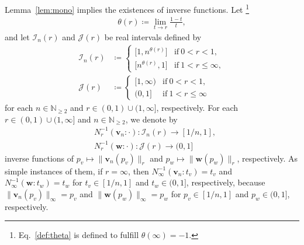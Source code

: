 \documentclass[conference, draftcls, onecolumn]{IEEEtran}
\theoremstyle{plain}
\newcommand{\bvec}[1]{\boldsymbol{#1}}
\newcommand{\lemref}[1]{Lemma~\ref{#1}}
\begin{document}
\lemref{lem:mono} implies the existences of inverse functions.
Let%
\footnote{Eq.~\eqref{def:theta} is defined to fulfill $\theta( \infty ) = -1$.}
\begin{align}
\theta( r )
\coloneqq
\lim_{t \to r} \frac{ 1 - t }{ t } ,
\label{def:theta}
\end{align}
and let $\mathcal{I}_{n}( r )$ and $\mathcal{J}( r )$ be real intervals defined by
\begin{align}
\mathcal{I}_{n}( r )
& \coloneqq
\begin{cases}
\big[ 1, n^{\theta( r )} \big]
& \mathrm{if} \ 0 < r < 1 ,
\\
\big[ n^{\theta( r )}, 1 \big]
& \mathrm{if} \ 1 < r \le \infty ,
\end{cases}
\label{def:I} \\
\mathcal{J}( r )
& \coloneqq
\begin{cases}
[1, \infty)
& \mathrm{if} \ 0 < r < 1 ,
\\
(0, 1]
& \mathrm{if} \ 1 < r \le \infty
\end{cases}
\label{def:J}
\end{align}
for each $n \in \mathbb{N}_{\ge 2}$ and $r \in (0, 1) \cup (1, \infty]$, respectively.
For each $r \in (0, 1) \cup (1, \infty]$ and $n \in \mathbb{N}_{\ge 2}$, we denote by
\begin{align}
&
N_{r}^{-1}(\bvec{v}_{n} : \cdot) : \mathcal{I}_{n}( r ) \to [1/n, 1] ,
\label{def:inv_Nv} \\
&
N_{r}^{-1}(\bvec{w} : \cdot) : \mathcal{J}( r ) \to (0, 1]
\label{def:inv_Nw}
\end{align}
inverse functions of $p_{v} \mapsto \| \bvec{v}_{n}( p_{v} ) \|_{r}$ and $p_{w} \mapsto \| \bvec{w}( p_{w} ) \|_{r}$, respectively.
As simple instances of them, if $r = \infty$, then $N_{\infty}^{-1}( \bvec{v}_{n} : t_{v} ) = t_{v}$ and $N_{\infty}^{-1}( \bvec{w} : t_{w} ) = t_{w}$ for $t_{v} \in [1/n, 1]$ and $t_{w} \in (0, 1]$, respectively, because $\| \bvec{v}_{n}( p_{v} ) \|_{\infty} = p_{v}$ and $\| \bvec{w}( p_{w} ) \|_{\infty} = p_{w}$ for $p_{v} \in [1/n, 1]$ and $p_{w} \in (0, 1]$, respectively.
\end{document}
